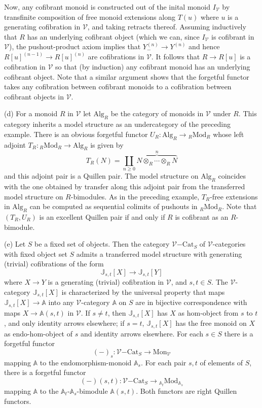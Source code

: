 \documentclass[10pt]{amsart}
\theoremstyle{plain}
\theoremstyle{remark}
\def\Vv{\mathcal{V}}
\def\Cat{\mathrm{Cat}}
\def\VCat{\Vv\mathrm{-}\Cat}
\def\Mon{\mathrm{Mon}}
\def\JJ{\mathbb{J}}
\def\AA{\mathbb{A}}
\def\Alg{\mathrm{Alg}}
\def\Mod{\mathrm{Mod}}
\begin{document}
Now, any cofibrant monoid is constructed out of the inital monoid $I_\Vv$ by transfinite composition of free monoid extensions along $T(u)$ where $u$ is a generating cofibration in $\Vv$, and taking retracts thereof. Assuming inductively that $R$ has an underlying cofibrant object (which we can, since $I_\Vv$ is cofibrant in $\Vv$), the pushout-product axiom implies that $Y_-^{(n)}\to Y^{(n)}$ and hence $R[u]^{(n-1)}\to R[u]^{(n)}$ are cofibrations in $\Vv$. It follows that $R\to R[u]$ is a cofibration in $\Vv$ so that (by induction) any cofibrant monoid has an underlying cofibrant object. Note that a similar argument shows that the forgetful functor takes any cofibration between cofibrant monoids to a cofibration between cofibrant objects in $\Vv$.\vspace{1ex}

(d) For a monoid $R$ in $\Vv$ let $\Alg_R$ be the category of monoids in $\Vv$ under $R$. This category inherits a model structure as an undercategory of the preceding example. There is an obvious forgetful functor $U_R:\Alg_R\to {}_R\Mod_R$ whose left adjoint $T_R:{}_R\Mod_R\to \Alg_R$ is given by$$T_R(N)=\coprod_{n\geq 0}\overbrace{N\otimes_R\cdots\otimes_RN}^n$$and this adjoint pair is a Quillen pair. The model structure on $\Alg_R$ coincides with the one obtained by transfer along this adjoint pair from the transferred model structure on $R$-bimodules. As in the preceding example, $T_R$-free extensions in $\Alg_R$ can be computed as sequential colimits of pushouts in ${}_R\Mod_R$. Note that $(T_R,U_R)$ is an excellent Quillen pair if and only if $R$ is cofibrant as an $R$-bimodule.\vspace{1ex}

(e) Let $S$ be a fixed set of objects. Then the category $\VCat_S$ of $\Vv$-categories with fixed object set $S$ admits a transferred model structure with generating (trivial) cofibrations of the form$$\JJ_{s,t}[X]\to\JJ_{s,t}[Y]$$where $X\to Y$ is a generating (trivial) cofibration in $\Vv$, and $s,t\in S$. The $\Vv$-category $\JJ_{s,t}[X]$ is characterized by the universal property that maps $\JJ_{s,t}[X]\to\AA$ into any $\Vv$-category $\AA$ on $S$ are in bijective correspondence with maps $X\to\AA(s,t)$ in $\Vv$. If $s\not=t$, then $\JJ_{s,t}[X]$ has $X$ as hom-object from $s$ to $t$, and only identity arrows elsewhere; if $s=t$, $\JJ_{s,t}[X]$ has the free monoid on $X$ as endo-hom-object of $s$ and identity arrows elsewhere. For each $s\in S$ there is a forgetful functor $$(-)_s:\VCat_S\to\Mon_\Vv$$mapping $\AA$ to the endomorphism-monoid $\AA_s$. For each pair $s,t$ of elements of $S$, there is a forgetful functor$$(-)(s,t):\VCat_S\to{}_{\AA_t}\Mod_{\AA_s}$$ mapping $\AA$ to the $\AA_t$-$\AA_s$-bimodule $\AA(s,t)$. Both functors are right Quillen functors.
\end{document}
